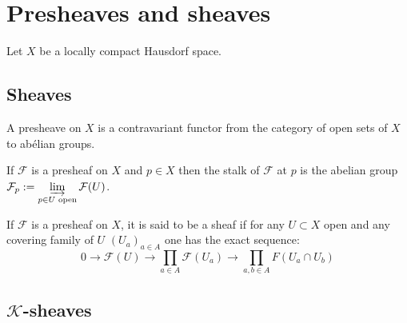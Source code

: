%


\chapter{Presheaves and sheaves}

Let $X$ be a locally compact Hausdorf space.

\section{Sheaves}


\begin{definition}
    \label{def:pre_sheaves}
    A presheave on $X$ is a contravariant functor from the category of open sets of $X$ to abélian groups.
\end{definition}

\begin{definition}
    \label{def:stalk}
    If $\mathcal{F}$ is a presheaf on $X$ and $p\in X$ then the stalk of $\mathcal{F}$ at $p$ is the abelian group $\mathcal{F}_p:=\varinjlim\limits_{p\in U\text{ open}}\mathcal{F}(U)$.
\end{definition}

\begin{definition}
    \label{def:sheaves}
    If $\mathcal{F}$ is a presheaf on $X$, it is said to be a sheaf if for any $U\subset X$ open and any covering family of $U$ $(U_a)_{a\in A}$ one has the exact sequence:
    \begin{equation}\label{axiom:Sh}
        0\to \mathcal{F}(U)\to \prod\limits_{a\in A}\mathcal{F}(U_a)\to \prod\limits_{a,b\in A}F(U_a\cap U_b)
    \end{equation}
\end{definition}

\section{$\mathcal{K}$-sheaves}

